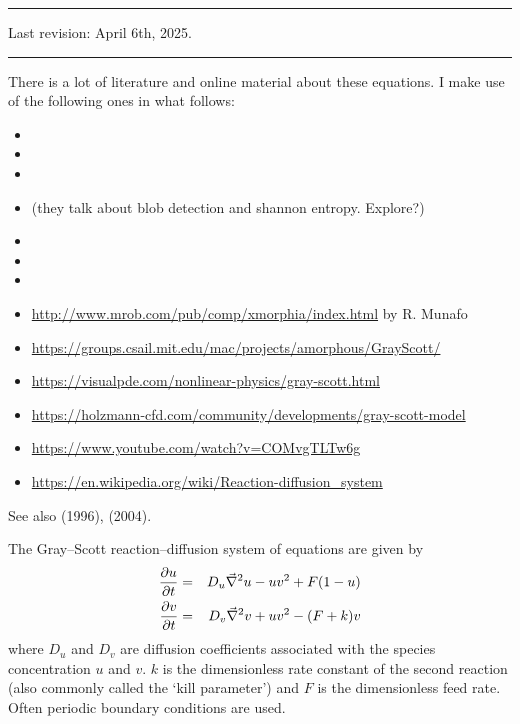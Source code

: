 \par\noindent\rule{\textwidth}{0.4pt}

Last revision: April 6th, 2025.

\par\noindent\rule{\textwidth}{0.4pt}


There is a lot of literature and online material about these equations. I make use of the following 
ones in what follows:
\begin{itemize}
\item {}
\item {}
\item {}
\item {} (they talk about blob detection and shannon entropy. Explore?)
\item {}
\item {}
\item {}
\item \url{http://www.mrob.com/pub/comp/xmorphia/index.html} by R. Munafo
\item \url{https://groups.csail.mit.edu/mac/projects/amorphous/GrayScott/}
\item \url{https://visualpde.com/nonlinear-physics/gray-scott.html}
\item \url{https://holzmann-cfd.com/community/developments/gray-scott-model}
\item \url{https://www.youtube.com/watch?v=COMvgTLTw6g}
\item \url{https://en.wikipedia.org/wiki/Reaction-diffusion_system}
\end{itemize}

See also \textcite{marm96} (1996), \textcite{mcri04} (2004).

The Gray–Scott reaction–diffusion system of equations are given by
\begin{eqnarray}
\frac{\partial u}{\partial t} &=& D_u \vec\nabla^2 u - uv^2 + F(1-u) \nonumber\\
\frac{\partial v}{\partial t} &=& D_v \vec\nabla^2 v + uv^2 - (F+k)v
\end{eqnarray}
where $D_u$ and $D_v$ are diffusion coefficients associated with the species concentration $u$
and $v$. $k$ is the dimensionless rate constant of the second reaction (also commonly called the `kill 
parameter') and $F$ is the dimensionless feed rate.
Often periodic boundary conditions are used. 

